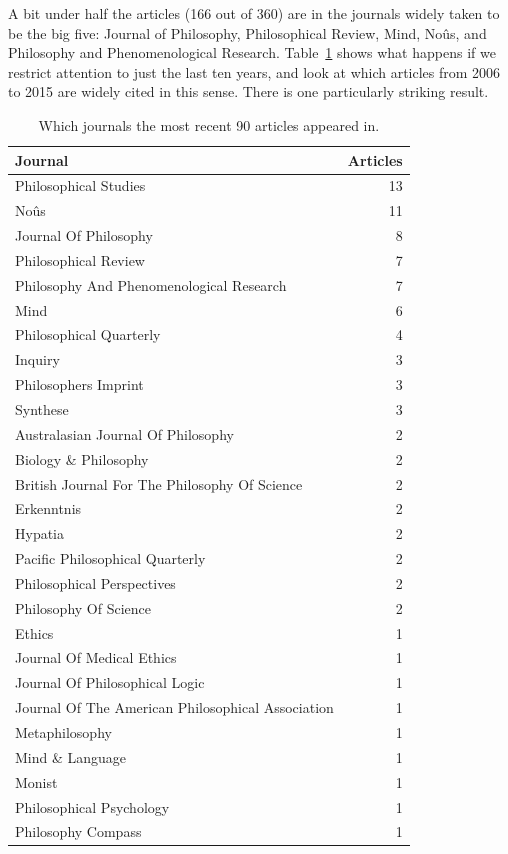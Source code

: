 \documentclass[
  10pt,
  letterpaper,
  DIV=11,
  numbers=noendperiod,
  twoside]{scrartcl}
\begin{document}
A bit under half the articles (166 out of 360) are in the journals
widely taken to be the big five: Journal of Philosophy, Philosophical
Review, Mind, Noûs, and Philosophy and Phenomenological Research.
Table~\ref{tbl-recent-journals-in-main-bib} shows what happens if we
restrict attention to just the last ten years, and look at which
articles from 2006 to 2015 are widely cited in this sense. There is one
particularly striking result.

\begin{longtable}[]{@{}lr@{}}

\caption{\label{tbl-recent-journals-in-main-bib}Which journals the most
recent 90 articles appeared in.}

\tabularnewline

\toprule\noalign{}
Journal & Articles \\
\midrule\noalign{}
\endhead
\bottomrule\noalign{}
\endlastfoot
Philosophical Studies & 13 \\
Noûs & 11 \\
Journal Of Philosophy & 8 \\
Philosophical Review & 7 \\
Philosophy And Phenomenological Research & 7 \\
Mind & 6 \\
Philosophical Quarterly & 4 \\
Inquiry & 3 \\
Philosophers Imprint & 3 \\
Synthese & 3 \\
Australasian Journal Of Philosophy & 2 \\
Biology \& Philosophy & 2 \\
British Journal For The Philosophy Of Science & 2 \\
Erkenntnis & 2 \\
Hypatia & 2 \\
Pacific Philosophical Quarterly & 2 \\
Philosophical Perspectives & 2 \\
Philosophy Of Science & 2 \\
Ethics & 1 \\
Journal Of Medical Ethics & 1 \\
Journal Of Philosophical Logic & 1 \\
Journal Of The American Philosophical Association & 1 \\
Metaphilosophy & 1 \\
Mind \& Language & 1 \\
Monist & 1 \\
Philosophical Psychology & 1 \\
Philosophy Compass & 1 \\

\end{longtable}
\end{document}
